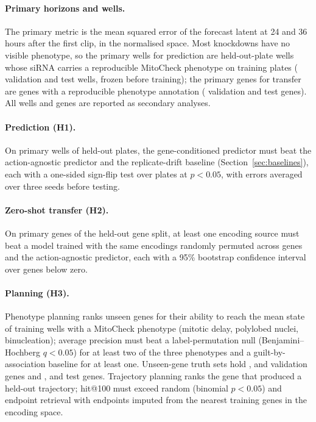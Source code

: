 \paragraph{Primary horizons and wells.} The primary metric is the mean squared error of the
forecast latent at 24 and 36 hours after the first clip, in the normalised space. Most
knockdowns have no visible phenotype, so the primary wells for prediction are held-out-plate
wells whose siRNA carries a reproducible MitoCheck phenotype on training plates
(\NPrimaryWellsVal{} validation and \NPrimaryWellsTest{} test wells, frozen before training); the
primary genes for transfer are genes with a reproducible phenotype annotation
(\NPrimaryGenesVal{} validation and \NPrimaryGenesTest{} test genes). All wells and genes are
reported as secondary analyses.

\paragraph{Prediction (H1).} On primary wells of held-out plates, the gene-conditioned
predictor must beat the action-agnostic predictor and the replicate-drift baseline
(Section~\ref{sec:baselines}), each with a one-sided sign-flip test over plates at $p<0.05$, with
errors averaged over three seeds before testing.

\paragraph{Zero-shot transfer (H2).} On primary genes of the held-out gene split, at least one
encoding source must beat a model trained with the same encodings randomly permuted across genes
and the action-agnostic predictor, each with a 95\% bootstrap confidence interval over genes
below zero.

\paragraph{Planning (H3).} Phenotype planning ranks unseen genes for their ability to reach the
mean state of training wells with a MitoCheck phenotype (mitotic delay, polylobed nuclei,
binucleation); average precision must beat a label-permutation null (Benjamini--Hochberg
$q<0.05$) for at least two of the three phenotypes and a guilt-by-association baseline for at
least one. Unseen-gene truth sets hold \NTruthMitoticDelayVal, \NTruthPolylobedVal{} and
\NTruthBinuclearVal{} validation genes and \NTruthMitoticDelayTest, \NTruthPolylobedTest{} and
\NTruthBinuclearTest{} test genes. Trajectory planning ranks the gene that produced a held-out
trajectory; hit@100 must exceed random (binomial $p<0.05$) and endpoint retrieval with endpoints
imputed from the nearest training genes in the encoding space.


